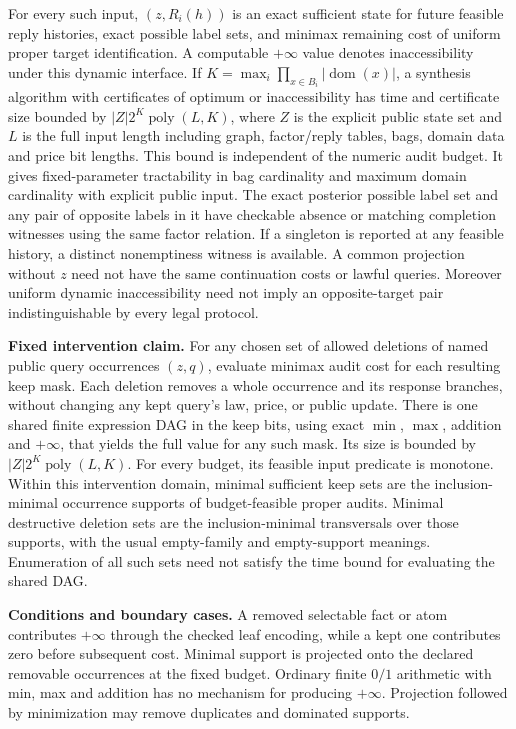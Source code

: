 \begin{theorem}
For every such input, \((z,R_i(h))\) is an exact sufficient state for future feasible reply histories, exact possible label sets, and minimax remaining cost of uniform proper target identification. A computable \(+\infty\) value denotes inaccessibility under this dynamic interface. If \(K=\max_i\prod_{x\in B_i}|\operatorname{dom}(x)|\), a synthesis algorithm with certificates of optimum or inaccessibility has time and certificate size bounded by \(|Z|2^K\operatorname{poly}(L,K)\), where \(Z\) is the explicit public state set and \(L\) is the full input length including graph, factor/reply tables, bags, domain data and price bit lengths. This bound is independent of the numeric audit budget. It gives fixed-parameter tractability in bag cardinality and maximum domain cardinality with explicit public input. The exact posterior possible label set and any pair of opposite labels in it have checkable absence or matching completion witnesses using the same factor relation. If a singleton is reported at any feasible history, a distinct nonemptiness witness is available. A common projection without \(z\) need not have the same continuation costs or lawful queries. Moreover uniform dynamic inaccessibility need not imply an opposite-target pair indistinguishable by every legal protocol.

\textbf{Fixed intervention claim.} For any chosen set of allowed deletions of named public query occurrences \((z,q)\), evaluate minimax audit cost for each resulting keep mask. Each deletion removes a whole occurrence and its response branches, without changing any kept query's law, price, or public update. There is one shared finite expression DAG in the keep bits, using exact \(\min\), \(\max\), addition and \(+\infty\), that yields the full value for any such mask. Its size is bounded by \(|Z|2^K\operatorname{poly}(L,K)\). For every budget, its feasible input predicate is monotone. Within this intervention domain, minimal sufficient keep sets are the inclusion-minimal occurrence supports of budget-feasible proper audits. Minimal destructive deletion sets are the inclusion-minimal transversals over those supports, with the usual empty-family and empty-support meanings. Enumeration of all such sets need not satisfy the time bound for evaluating the shared DAG.

\textbf{Conditions and boundary cases.} A removed selectable fact or atom contributes \(+\infty\) through the checked leaf encoding, while a kept one contributes zero before subsequent cost. Minimal support is projected onto the declared removable occurrences at the fixed budget. Ordinary finite \(0/1\) arithmetic with min, max and addition has no mechanism for producing \(+\infty\). Projection followed by minimization may remove duplicates and dominated supports.

\end{theorem}

